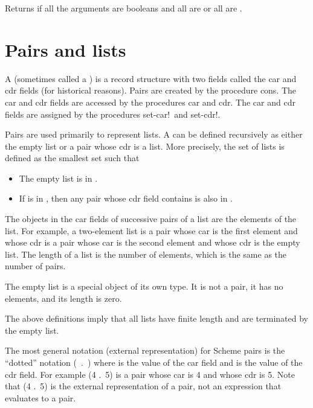 \begin{entry}{
}

Returns \schtrue{} if all the arguments are booleans and all
are \schtrue{} or all are \schfalse{}.

\end{entry}

\section{Pairs and lists}
\label{listsection}

A  (sometimes called a ) is a
record structure with two fields called the car and cdr fields (for
historical reasons).  Pairs are created by the procedure {\cf cons}.
The car and cdr fields are accessed by the procedures {\cf car} and
{\cf cdr}.  The car and cdr fields are assigned by the procedures
{\cf set-car!}\ and {\cf set-cdr!}.

Pairs are used primarily to represent lists.  A  can
be defined recursively as either the empty list or a pair whose
cdr is a list.  More precisely, the set of lists is defined as the smallest
set  such that

\begin{itemize}
\item The empty list is in .
\item If  is in , then any pair whose cdr field contains
       is also in .
\end{itemize}

The objects in the car fields of successive pairs of a list are the
elements of the list.  For example, a two-element list is a pair whose car
is the first element and whose cdr is a pair whose car is the second element
and whose cdr is the empty list.  The length of a list is the number of
elements, which is the same as the number of pairs.

The empty list is a special object of its own type.
It is not a pair, it has no elements, and its length is zero.

\begin{note}
The above definitions imply that all lists have finite length and are
terminated by the empty list.
\end{note}

The most general notation (external representation) for Scheme pairs is
the ``dotted'' notation \hbox{\cf ( .\ )} where
 is the value of the car field and  is the value of the
cdr field.  For example {\cf (4 .\ 5)} is a pair whose car is 4 and whose
cdr is 5.  Note that {\cf (4 .\ 5)} is the external representation of a
pair, not an expression that evaluates to a pair.

